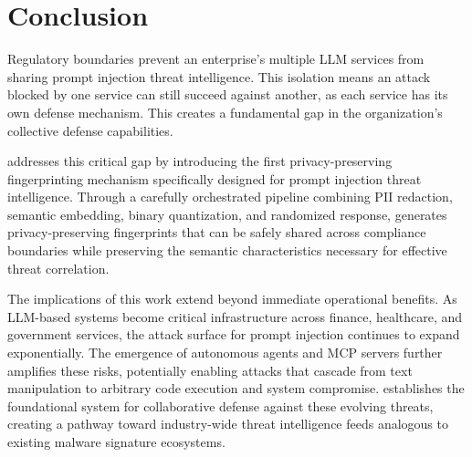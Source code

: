 \section{Conclusion}
\label{sec:conclusion}



Regulatory boundaries prevent an enterprise's multiple LLM services from sharing prompt injection threat intelligence. This isolation means an attack blocked by one service can still succeed against another, as each service has its own defense mechanism. 
This creates a fundamental gap in the organization's collective defense capabilities.

\tool addresses this critical gap by introducing the first privacy-preserving fingerprinting mechanism specifically designed for prompt injection threat intelligence. Through a carefully orchestrated pipeline combining PII redaction, semantic embedding, binary quantization, and randomized response, \tool generates privacy-preserving fingerprints that can be safely shared across compliance boundaries while preserving the semantic characteristics necessary for effective threat correlation. 

The implications of this work extend beyond immediate operational benefits. As LLM-based systems become critical infrastructure across finance, healthcare, and government services, the attack surface for prompt injection continues to expand exponentially. The emergence of autonomous agents and MCP servers further amplifies these risks, potentially enabling attacks that cascade from text manipulation to arbitrary code execution and system compromise. \tool establishes the foundational system for collaborative defense against these evolving threats, creating a pathway toward industry-wide threat intelligence feeds analogous to existing malware signature ecosystems.

